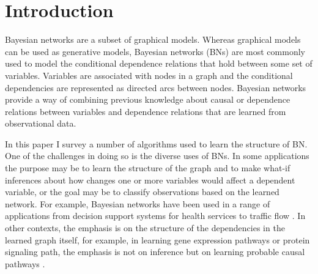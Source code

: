 






\chapter{Introduction}



    Bayesian networks are a subset of graphical models. 
    Whereas graphical models can be used as generative models,
    Bayesian networks (BNs) are
    most commonly used to model the conditional dependence
    relations that hold between some set of variables. 
    Variables
    are associated with nodes in a graph and the conditional
    dependencies are represented as directed arcs between 
    nodes. Bayesian networks provide a way of 
    combining previous knowledge about causal or dependence
    relations between variables and dependence relations
    that are learned from observational data.
    
    In this paper I survey a number of algorithms used
    to learn the structure of BN. One of the challenges 
    in doing so is the diverse uses of BNs. In some applications
    the purpose may be to learn the structure of the 
    graph and to make what-if inferences about how changes one or more variables would affect a dependent variable, or the goal may be to classify observations based on 
    the learned network. For example, Bayesian networks
    have been used in a range of applications from
     decision support systems for health services
     to traffic flow \cite{Zhou2007}. 
    In other contexts, the emphasis is on the structure
    of the dependencies in the learned graph itself, 
    for example, in learning gene expression pathways
    or protein signaling path, the emphasis
    is not on inference but on learning probable causal pathways 
    \cite{Colombo2014}\cite{Sachs2005}.

